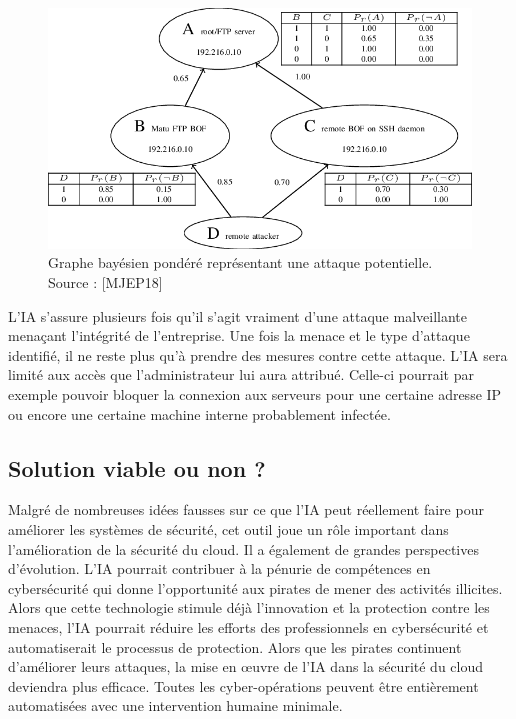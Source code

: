 \documentclass[a4paper, 12pt]{article}
\begin{document}
\begin{spacing}{1.1}
      \begin{figure}[h]
        \centering
        \includegraphics[scale=.5]{img/attackgraph.png}
        \caption{Graphe bayésien pondéré représentant une attaque potentielle.
        Source : [MJEP18]}
        \label{fig:1}
      \end{figure}

      L’IA s’assure plusieurs fois qu’il s’agit vraiment d’une attaque
      malveillante menaçant l’intégrité de l’entreprise. Une fois la menace et
      le type d’attaque identifié, il ne reste plus qu’à prendre des mesures
      contre cette attaque. L’IA sera limité aux accès que l’administrateur lui
      aura attribué. Celle-ci pourrait par exemple pouvoir bloquer la connexion
      aux serveurs pour une certaine adresse IP ou encore une certaine machine
      interne probablement infectée.

    \subsection{Solution viable ou non ?}
      Malgré de nombreuses idées fausses sur ce que l'IA peut réellement
      faire pour améliorer les systèmes de sécurité, cet outil joue un rôle
      important dans l'amélioration de la sécurité du cloud. Il a également de
      grandes perspectives d’évolution. L’IA pourrait contribuer à la pénurie de
      compétences en cybersécurité qui donne l'opportunité aux pirates de mener
      des activités illicites. Alors que cette technologie stimule déjà
      l'innovation et la protection contre les menaces, l'IA pourrait réduire
      les efforts des professionnels en cybersécurité et automatiserait le
      processus de protection. Alors que les pirates continuent d'améliorer
      leurs attaques, la mise en œuvre de l'IA dans la sécurité du cloud
      deviendra plus efficace. Toutes les cyber-opérations peuvent être
      entièrement automatisées avec une intervention humaine minimale. \\


\end{spacing}
\end{document}
